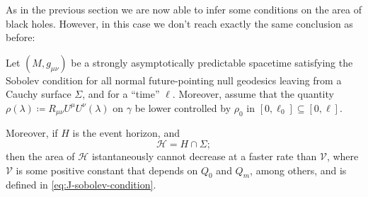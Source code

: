 As in the previous section we are now able to infer some conditions on the area of black holes. However, in this case we don't reach exactly the same conclusion as before:
\begin{theorem}
	\label{th:sobolev-bh-area}
	Let \((M, g_{\mu\nu})\) be a strongly asymptotically predictable spacetime satisfying the Sobolev condition for all normal future-pointing null geodesics leaving from a Cauchy surface \(\Sigma\), and for a ``time'' \(\ell\). Moreover, assume that the quantity \(\rho(\lambda) \coloneqq R_{\mu\nu}U^{\mu}U^{\nu}(\lambda) \) on \(\gamma\) be lower controlled by \(\rho_0\) in \([0, \ell_0] \subseteq [0, \ell]\). 
	
	Moreover, if \(H\) is the event horizon, and
	\[
	\mathscr{H} = H \cap \Sigma ;
	\]
	then the area of \(\mathscr{H}\) istantaneously cannot decrease at a faster rate than \(\mathcal{V}\), 
	where \(\mathcal{V}\) is some positive constant that depends on \(Q_0\) and \(Q_m\), among others, and is defined in \eqref{eq:J-sobolev-condition}.
\end{theorem}

